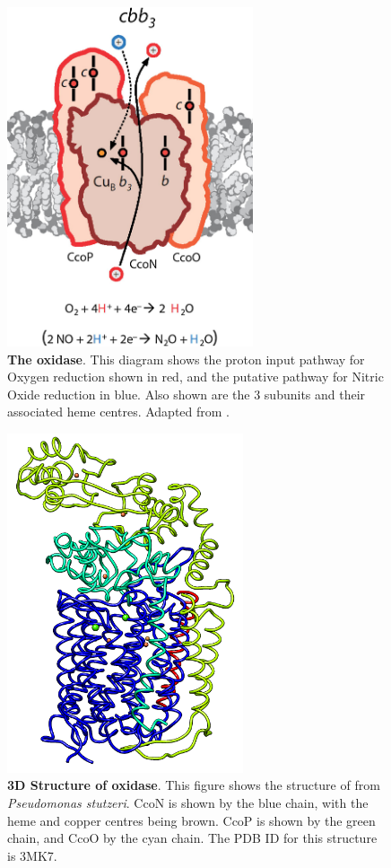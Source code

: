 \begin{figure}[tbp]
  \begin{center}
    \includegraphics[height=10cm]{01-introduction/data/cbb3_only.png}
  \end{center}
  \caption[{The \cbbthree{} oxidase}.]{{\bf The \cbbthree{} oxidase}. This diagram shows the proton input pathway for Oxygen reduction shown in red, and the putative pathway for Nitric Oxide reduction in blue. Also shown are the 3 subunits and their associated heme centres. Adapted from \citet{Huang2010}.
  \label{fig:cbb3}}
\end{figure}

\begin{figure}[tbp]
  \begin{center}
    \includegraphics[height=10cm]{01-introduction/data/cbb3_struct.png}
  \end{center}
  \caption[{3D Structure of \cbbthree{} oxidase}.]{{\bf 3D Structure of \cbbthree{} oxidase}. This figure shows the structure of \cbbthree{} from \textit{Pseudomonas stutzeri}\cite{Buschmann2010}. CcoN is shown by the blue chain, with the heme and copper centres being brown. CcoP is shown by the green chain, and CcoO by the cyan chain. The PDB ID for this structure is 3MK7.
  \label{fig:cbb3_struct}}
\end{figure}


